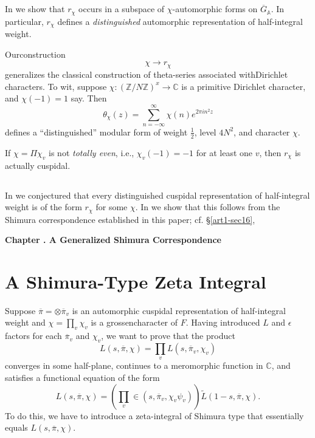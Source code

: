 \subsection{}\label{art1-sec11.2}
In \cite{GePS2} we show that $r_{\chi}$ occurs in a subspace of $\chi$-automorphic forms on $\overline{G}_{\mathbb{A}}$. In particular, $r_{\chi}$ defines a {\em distinguished} automorphic representation of half-integral weight.

Our\pageoriginale construction
$$
\chi\to r_{\chi}
$$
generalizes the classical construction of theta-series associated with\break Dirichlet characters. To wit, suppose $\chi:(\mathbb{Z}/N\mathbb{Z})^{x}\to \mathbb{C}$ is a primitive Dirichlet character, and $\chi(-1)=1$ say. Then
$$
\theta_{\chi}(z)=\sum\limits^{\infty}_{n=-\infty}\chi(n)e^{2\pi in^{2}z}
$$
defines a ``distinguished'' modular form of weight $\frac{1}{2}$, level $4N^{2}$, and character $\chi$.

If $\chi=\Pi \chi_{v}$ is not {\em totally even}, i.e., $\chi_{v}(-1)=-1$ for at least one $v$, then $r_{\chi}$ is actually cuspidal.

\subsection{}\label{art1-sec11.3}
In \cite{GePS} we conjectured that every distinguished cuspidal representation of half-integral weight is of the form $r_{\chi}$ for some $\chi$. In \cite{GePS2} we show that this follows from the Shimura correspondence established in this paper; cf. \S\ref{art1-sec16},

\bigskip
\begin{center}
{\large\bfseries Chapter .\label{art1-chap-III} A Generalized Shimura Correspondence}
\end{center}
\smallskip

\section{A Shimura-Type Zeta Integral}\label{art1-sec12}

Suppose $\overline{\pi}=\otimes \overline{\pi}_{v}$ is an automorphic cuspidal representation of half-integral weight and $\chi=\prod\limits_{v}\chi_{v}$ is a grossencharacter of $F$. Having introduced $L$ and $\epsilon$ factors for each $\overline{\pi}_{v}$ and $\chi_{v}$, we want to prove that the product
$$
L(s,\overline{\pi},\chi)=\prod\limits_{v}L(s,\overline{\pi}_{v},\chi_{v})
$$
converges in some half-plane, continues to a meromorphic function in $\mathbb{C}$, and satisfies a functional equation of the form
$$
L(s,\overline{\pi},\chi)=\left(\prod\limits_{v}\in (s,\overline{\pi}_{v},\chi_{v}\psi_{v})\right)\widetilde{L}(1-s,\overline{\pi},\chi).
$$
To do this, we have to introduce a zeta-integral of Shimura type that essentially equals $L(s,\overline{\pi},\chi)$.


